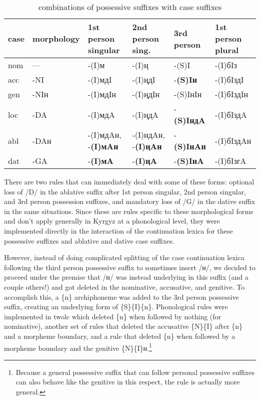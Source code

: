 \documentclass[a4paper,12pt,onecolumn,oneside]{article}
\begin{document}
\begin{table}[htbp]
	\caption{combinations of possessive suffixes with case suffixes}\label{irregposcase}
	\begin{tabular}{llllll}
		\toprule
		case & morphology & 1st person singular & 2nd person sing. & 3rd person & 1st person plural \\
		\midrule
		nom & — & -(I)м & -(I)ң & -(S)I & -(I)бIз \\
		acc & -NI & -(I)мдI & -(I)ңдI & -\textbf{(S)Iн} & -(I)бIздI \\
		gen & -NIн & -(I)мдIн & -(I)ңдIн & -(S)IнIн & -(I)бIздIн \\
		loc & -DA & -(I)мдA & -(I)ңдA & -\textbf{(S)IндA} & -(I)бIздA \\
		abl & -DAн & -(I)мдAн, -\textbf{(I)мAн} & -(I)ндAн, -\textbf{(I)ңAн} & -\textbf{(S)IнAн} & -(I)бIздAн \\
		dat & -GA & -\textbf{(I)мA} & -\textbf{(I)ңA} & -\textbf{(S)IнA} & -(I)бIзгA \\
		\bottomrule
	\end{tabular}
\end{table}

There are two rules that can immediately deal with some of these forms: optional loss of /D/ in the ablative suffix after 1st person singular, 2nd person singular, and 3rd person possession suffixes, and mandatory loss of /G/ in the dative suffix in the same situations.  Since these are rules specific to these morphological forms and don’t apply generally in Kyrgyz at a phonological level, they were implemented directly in the interaction of the continuation lexica for these possessive suffixes and ablative and dative case suffixes.

However, instead of doing complicated splitting of the case continuation lexica following the third person possessive suffix to sometimes insert /н/, we decided to proceed under the premise that /н/ was instead underlying in this suffix (and a couple others!) and got deleted in the nominative, accusative, and genitive.  To accomplish this, a \{n\} archiphoneme was added to the 3rd person possessive suffix, creating an underlying form of \{S\}\{I\}\{n\}.  Phonological rules were implemented in twolc which deleted \{n\} when followed by nothing (for nominative), another set of rules that deleted the accusative \{N\}\{I\} after \{n\} and a morpheme boundary, and a rule that deleted \{n\} when followed by a morpheme boundary and the genitive \{N\}\{I\}н.\footnote{Because a general possessive suffix that can follow personal possessive suffixes can also behave like the genitive in this respect, the rule is actually more general.}
\end{document}

